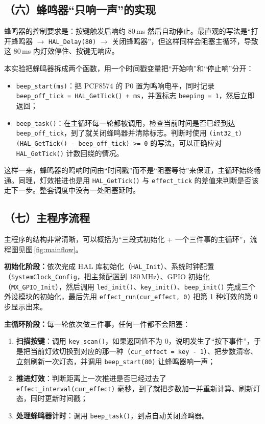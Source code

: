 \documentclass[UTF8,zihao=5,fontset=fandol]{ctexart}
\begin{document}
\begin{reportsection}{\MethodTitle}{\MethodHint}
  \subsection*{（六）蜂鸣器“只响一声”的实现}

  蜂鸣器的控制要求是：按键触发后响约 80\,ms 然后自动停止。最直观的写法是“打开蜂鸣器 $\rightarrow$ \texttt{HAL\_Delay(80)} $\rightarrow$ 关闭蜂鸣器”，但这样同样会阻塞主循环，导致这 80\,ms 内灯效停住、按键无响应。

  本实验把蜂鸣器拆成两个函数，用一个时间戳变量把“开始响”和“停止响”分开：

  \begin{itemize}
    \item \texttt{beep\_start(ms)}：把 PCF8574 的 P0 置为鸣响电平，同时记录 \texttt{beep\_off\_tick = HAL\_GetTick() + ms}，并置标志 \texttt{beeping = 1}，然后立即返回；
    \item \texttt{beep\_task()}：在主循环每一轮都被调用，检查当前时间是否已经到达 \texttt{beep\_off\_tick}，到了就关闭蜂鸣器并清除标志。判断时使用 \texttt{(int32\_t)(HAL\_GetTick() - beep\_off\_tick) >= 0} 的写法，可以正确应对 \texttt{HAL\_GetTick()} 计数回绕的情况。
  \end{itemize}

  这样一来，蜂鸣器的鸣响时间由“时间戳”而不是“阻塞等待”来保证，主循环始终畅通。同理，灯效推进也是用 \texttt{HAL\_GetTick()} 与 \texttt{effect\_tick} 的差值来判断是否该走下一步。整套调度中没有一处阻塞延时。

  \subsection*{（七）主程序流程}

  主程序的结构非常清晰，可以概括为“三段式初始化 + 一个三件事的主循环”，流程图见图\,\ref{fig:mainflow}。

  \textbf{初始化阶段：}依次完成 HAL 库初始化（\texttt{HAL\_Init}）、系统时钟配置（\texttt{SystemClock\_Config}，把主频配置到 180\,MHz）、GPIO 初始化（\texttt{MX\_GPIO\_Init}），然后调用 \texttt{led\_init()}、\texttt{key\_init()}、\texttt{beep\_init()} 完成三个外设模块的初始化，最后先用 \texttt{effect\_run(cur\_effect, 0)} 把第 1 种灯效的第 0 步显示出来。

  \textbf{主循环阶段：}每一轮依次做三件事，任何一件都不会阻塞：

  \begin{enumerate}[label=\arabic*)]
    \item \textbf{扫描按键}：调用 \texttt{key\_scan()}，如果返回值不为 0，说明发生了“按下事件”，于是把当前灯效切换到对应的那一种（\texttt{cur\_effect = key - 1}）、把步数清零、立刻刷新一次灯态，并调用 \texttt{beep\_start(80)} 让蜂鸣器响一声；
    \item \textbf{推进灯效}：判断距离上一次推进是否已经过去了 \texttt{effect\_interval(cur\_effect)} 毫秒，到了就把步数加一并重新计算、刷新灯态，同时更新时间戳；
    \item \textbf{处理蜂鸣器计时}：调用 \texttt{beep\_task()}，到点自动关闭蜂鸣器。
  \end{enumerate}


\end{reportsection}
\end{document}
